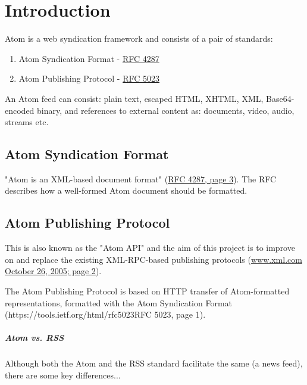 
%



\chapter{Introduction}
Atom is a web syndication framework and consists of a pair of standards:

\begin{enumerate}
\item Atom Syndication Format - \href{https://tools.ietf.org/html/rfc4287}{RFC 4287}
\item Atom Publishing Protocol - \href{https://tools.ietf.org/html/rfc5023}{RFC 5023}
\end{enumerate}

An Atom feed can consist: plain text, escaped HTML, XHTML, XML, Base64-encoded binary, and references to external content as: documents, video, audio, streams etc.

\section{Atom Syndication Format}
"Atom is an XML-based document format" (\href{https://tools.ietf.org/html/rfc4287}{RFC 4287, page 3}). The RFC describes how a well-formed Atom document should be formatted.

\section{Atom Publishing Protocol}
This is also known as the "Atom API" and the aim of this project is to improve on and replace the existing XML-RPC-based publishing protocols (\href{http://www.xml.com/pub/a/2005/10/26/what-is-atom.html?page=2}{www.xml.com October 26, 2005; page 2}).

The Atom Publishing Protocol is based on HTTP transfer of Atom-formatted representations, formatted with the Atom Syndication Format ({https://tools.ietf.org/html/rfc5023}{RFC 5023, page 1}).

\paragraph{Atom vs. RSS}
Although both the Atom and the RSS standard facilitate the same (a news feed), there are some key differences...

